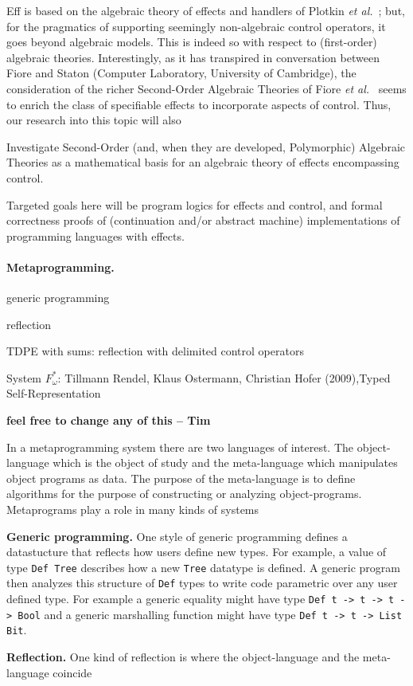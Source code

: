 \documentclass[11pt,twocolumn]{article}
\newcounter{CC}
\newenvironment{resenumerate}
  {\begin{list}{[\textbf{\arabic{CC}]}}
  {\usecounter{CC}
   \setlength{\topsep}{2pt}
   \setlength{\partopsep}{2pt}
   \setlength{\itemsep}{2.5pt}
   \setlength{\parsep}{2.5pt}
   \setlength{\leftmargin}{1.65em}
   \setlength{\labelwidth}{1.15em}
 }}
  {\end{list}}
\newcommand{\hide}[1]{}
\newcommand{\hidenote}{\hide}
\newcommand{\etal}{\emph{et al.}}
\begin{document}
Eff is based on the algebraic theory of effects and handlers of Plotkin
\etal~\cite{PlotkinPowerAlgOpsAndGenEffs,PlotkinPretnar};
but, for the pragmatics of supporting seemingly non-algebraic control
operators, it goes beyond algebraic models.  This is indeed so with
respect to (first-order) algebraic theories.  Interestingly, as it has
transpired in conversation between Fiore and Staton (Computer Laboratory,
University of Cambridge), the consideration of the richer Second-Order
Algebraic Theories of Fiore \etal~\cite{FioreHurLMCS,FioreMahmoud} seems to
enrich the class of specifiable effects to incorporate aspects of control.
Thus, our research into this topic will also
\begin{resenumerate}\setcounter{CC}{5}
\item
  Investigate Second-Order (and, when they are developed, Polymorphic)
  Algebraic Theories as a mathematical basis for an algebraic theory of
  effects encompassing control.
\end{resenumerate}
Targeted goals here will be program logics for effects and control, and formal
correctness proofs of (continuation and/or abstract machine) implementations
of programming languages with effects.

\hidenote{Dependent CBPV}

\paragraph{Metaprogramming.}
\label{MetaprogrammingParagraph}

{\color{red}

  generic programming

  reflection

  TDPE with sums: reflection with delimited control operators

  System $F_\omega^*$: Tillmann Rendel, Klaus Ostermann, Christian
  Hofer (2009),Typed Self-Representation

{\bf feel free to change any of this -- Tim}

In a metaprogramming system there are two languages of interest. The
object-language which is the object of study and the meta-language which
manipulates object programs as data. The purpose of the meta-language is
to define algorithms for the purpose of constructing or analyzing
object-programs. Metaprograms play a role in many kinds of systems

{\bf Generic programming.}
One style of generic programming defines a datastucture that reflects how
users define new types. For example, a value of type \verb+Def Tree+
describes how a new \verb+Tree+ datatype is defined. A generic program then
analyzes this structure of \verb+Def+ types to write code parametric over
any user defined type. For example a generic equality might have type
\verb+Def t -> t -> t -> Bool+ and a generic marshalling function
might have type \verb+Def t -> t -> List Bit+. 

{\bf Reflection.} One kind of reflection is where the object-language and
the meta-language coincide
}
\end{document}
